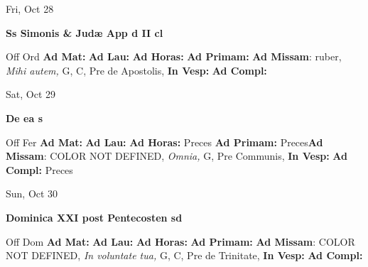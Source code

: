 \documentclass[10pt]{book}
\begin{document}
\begin{center}
\begin{minipage}{3.5in}
\vspace{2em}
\begin{center}Fri, Oct 28
\end{center}
\textbf{ \large Ss Simonis \& Judæ App
\textnormal{\normalsize d II cl}}

\begin{justify}Off Ord
\textbf{Ad Mat: }
\textbf{Ad Lau: }
\textbf{Ad Horas: }
\textbf{Ad Primam: }\textbf{Ad Missam}: ruber, \textit{Mihi autem,} G, C, Pre de Apostolis, 
\textbf{In Vesp: }
\textbf{Ad Compl: }
\end{justify}
\end{minipage}
\end{center}

\begin{center}
\begin{minipage}{3.5in}
\vspace{2em}
\begin{center}Sat, Oct 29
\end{center}
\textbf{ \large De ea
\textnormal{\normalsize s}}

\begin{justify}Off Fer
\textbf{Ad Mat: }
\textbf{Ad Lau: }
\textbf{Ad Horas: }Preces
\textbf{Ad Primam: }Preces\textbf{Ad Missam}: COLOR NOT DEFINED, \textit{Omnia,} G, Pre Communis, 
\textbf{In Vesp: }
\textbf{Ad Compl: }Preces
\end{justify}
\end{minipage}
\end{center}

\begin{center}
\begin{minipage}{3.5in}
\vspace{2em}
\begin{center}Sun, Oct 30
\end{center}
\textbf{ \large Dominica XXI post Pentecosten
\textnormal{\normalsize sd}}

\begin{justify}Off Dom
\textbf{Ad Mat: }
\textbf{Ad Lau: }
\textbf{Ad Horas: }
\textbf{Ad Primam: }\textbf{Ad Missam}: COLOR NOT DEFINED, \textit{In voluntate tua,} G, C, Pre de Trinitate, 
\textbf{In Vesp: }
\textbf{Ad Compl: }
\end{justify}
\end{minipage}
\end{center}
\end{document}
